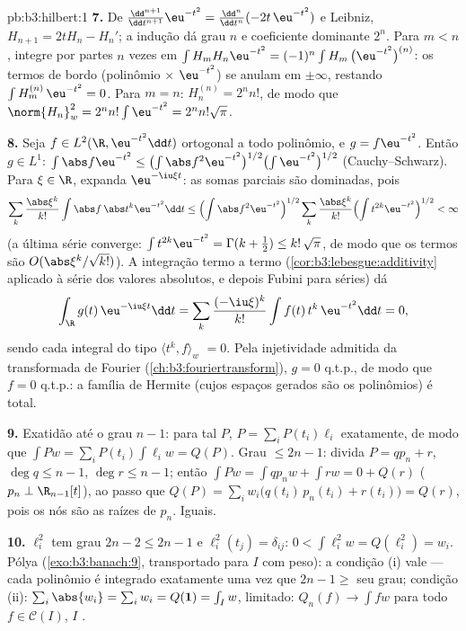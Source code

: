 \begin{solution}{pb:b3:hilbert:1}
\textbf{7.} De $\frac{\dd^{n+1}}{\dd t^{n+1}}\eu^{-t^2} =
\frac{\dd^n}{\dd t^n}(-2t\,\eu^{-t^2})$ e Leibniz, $H_{n+1}
= 2tH_n - H_n'$; a indução dá grau $n$ e coeficiente
dominante $2^n$. Para $m < n$, integre por partes $n$ vezes
em $\int H_m H_n\eu^{-t^2} = (-1)^n\int H_m\,\bigl(\eu^{-t^2}
\bigr)^{(n)}$: os termos de bordo (polinômio $\times$
$\eu^{-t^2}$) se anulam em $\pm\infty$, restando $\int
H_m^{(n)}\,\eu^{-t^2} = 0$. Para $m = n$: $H_n^{(n)} = 2^nn!$,
de modo que $\norm{H_n}_w^2 = 2^nn!\int\eu^{-t^2} = 2^nn!\sqrt\pi$.

\textbf{8.} Seja $f \in L^2(\R, \eu^{-t^2}\dd t)$ ortogonal
a todo polinômio, e $g = f\eu^{-t^2}$. Então $g \in
L^1$: $\int\abs f\eu^{-t^2} \leq \bigl(\int\abs
f^2\eu^{-t^2}\bigr)^{1/2}\bigl(\int\eu^{-t^2}\bigr)^{1/2}$
(Cauchy--Schwarz). Para $\xi \in \R$, expanda $\eu^{-\iu\xi t}$:
as somas parciais são dominadas, pois
\[
\sum_k\frac{\abs\xi^k}{k!}\int\abs f\,\abs t^k\eu^{-t^2}\dd t
\leq \Bigl(\int \abs f^2\eu^{-t^2}\Bigr)^{1/2}
\sum_k\frac{\abs\xi^k}{k!}\Bigl(\int
t^{2k}\eu^{-t^2}\Bigr)^{1/2} < \infty
\]
(a última série converge: $\int t^{2k}\eu^{-t^2} =
\Gamma(k+\frac12) \leq k!\,\sqrt\pi$, de modo que os termos são
$O(\abs\xi^k/\sqrt{k!})$). A integração termo a termo
(\cref{cor:b3:lebesgue:additivity} aplicado à série dos valores
absolutos, e depois Fubini para séries) dá
\[
\int_\R g(t)\,\eu^{-\iu\xi t}\dd t
= \sum_k\frac{(-\iu\xi)^k}{k!}\int f(t)\,t^k\,\eu^{-t^2}\dd t
= 0 ,
\]
sendo cada integral do tipo $\langle t^k, f\rangle_w$ $= 0$. Pela
injetividade admitida da transformada de Fourier
(\cref{ch:b3:fouriertransform}), $g = 0$ q.t.p., de modo que $f = 0$
q.t.p.: a família de Hermite (cujos espaços gerados são os polinômios) é
total.

\textbf{9.} Exatidão até o grau $n - 1$: para tal $P$, $P =
\sum_iP(t_i)\ell_i$ exatamente, de modo que $\int Pw = \sum_iP(t_i)\int
\ell_iw = Q(P)$. Grau $\leq 2n - 1$: divida $P = qp_n + r$,
$\deg q \leq n - 1$, $\deg r \leq n-1$; então $\int Pw = \int
qp_nw + \int rw = 0 + Q(r)$ ($p_n \perp \R_{n-1}[t]$), ao passo que
$Q(P) = \sum_iw_i\bigl(q(t_i)\,p_n(t_i) + r(t_i)\bigr) = Q(r)$,
pois os nós são as raízes de $p_n$. Iguais.

\textbf{10.} $\ell_i^2$ tem grau $2n - 2 \leq 2n - 1$ e
$\ell_i^2(t_j) = \delta_{ij}$: $0 < \int\ell_i^2w = Q(\ell_i^2)
= w_i$. Pólya (\cref{exo:b3:banach:9}, transportado para $I$ com
peso): a condição (i) vale --- cada polinômio é integrado
exatamente uma vez que $2n - 1 \geq$ seu grau; condição (ii):
$\sum_i\abs{w_{i}} = \sum_iw_i = Q(\mathbf 1) = \int_Iw$,
limitado: $Q_n(f) \to \int fw$ para todo $f \in \mathcal C(I)$,
$I$ .


\end{solution}
